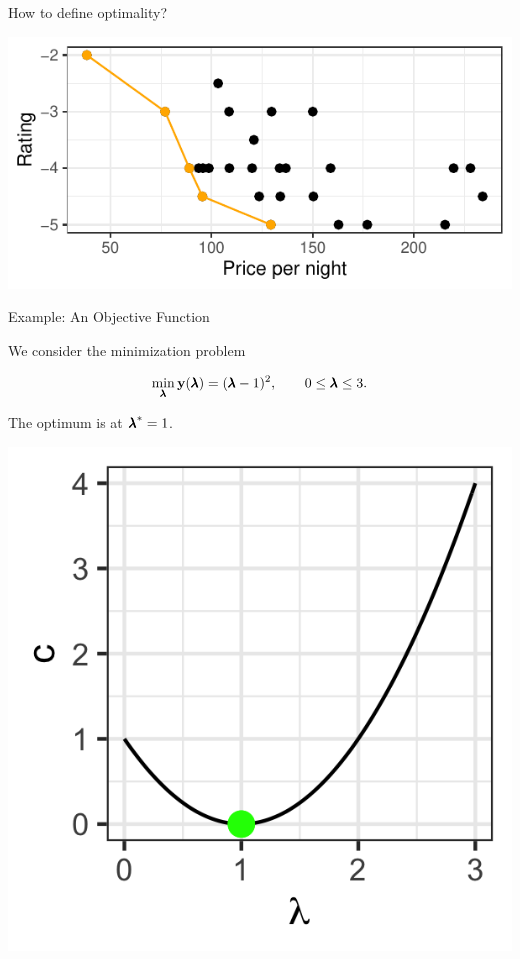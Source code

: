 \begin{frame}[allowframebreaks]{How to define optimality?}
\begin{itemize}
\vspace*{0.3cm}

\centering \includegraphics[width=0.8\linewidth]{images/expedia-5-1}

\end{itemize}

\end{frame}

\begin{frame}{Example: An Objective Function}


We consider the minimization problem

$$
\min_{\pmb{\lambda}} \mathbf{y}(\pmb{\lambda}) = (\pmb{\lambda} - 1)^2, \qquad 0 \le \pmb{\lambda} \le 3.
$$

The optimum is at ${\pmb{\lambda}}^* = 1$.

\vspace*{0.1cm}


\centering \includegraphics[scale=0.2]{images/graph1}


\end{frame}

